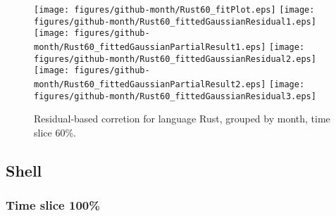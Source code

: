\begin{figure}[hb]
\centering
{}
{\texttt{[image: figures/github-month/Rust60\_fitPlot.eps]}}
{\texttt{[image: figures/github-month/Rust60\_fittedGaussianResidual1.eps]}}
{\texttt{[image: figures/github-month/Rust60\_fittedGaussianPartialResult1.eps]}}
{\texttt{[image: figures/github-month/Rust60\_fittedGaussianResidual2.eps]}}
{\texttt{[image: figures/github-month/Rust60\_fittedGaussianPartialResult2.eps]}}
{\texttt{[image: figures/github-month/Rust60\_fittedGaussianResidual3.eps]}}
\caption{Residual-based corretion for language Rust, grouped by month, time slice 60\%.}
\end{figure}


\clearpage 
\newpage 


\subsection{Shell}

\FloatBarrier

\subsubsection{Time slice 100\%}

